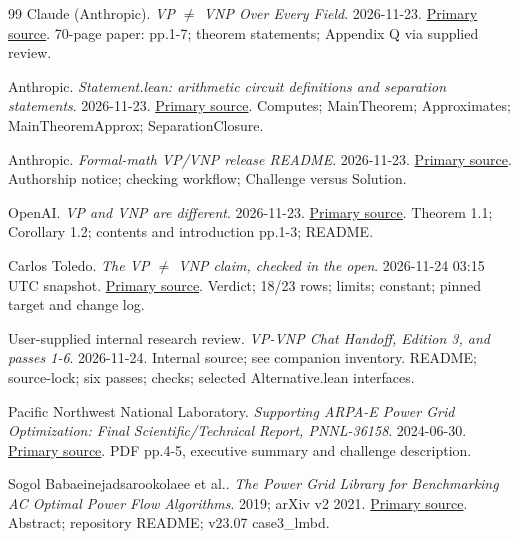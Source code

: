 \documentclass[11pt,letterpaper]{article}
\begin{document}
\endgroup
\clearpage
{}
\begin{thebibliography}{99}
 Claude (Anthropic). \emph{VP $\ne$ VNP Over Every Field}. 2026-11-23. \href{https://github.com/anthropics/formal-math/blob/11b6c7e3c927df2658f513b6b68ea7f8929c62c5/vp-vnp/paper.pdf}{Primary source}. 70-page paper: pp.1-7; theorem statements; Appendix Q via supplied review.

 Anthropic. \emph{Statement.lean: arithmetic circuit definitions and separation statements}. 2026-11-23. \href{https://github.com/anthropics/formal-math/blob/11b6c7e3c927df2658f513b6b68ea7f8929c62c5/vp-vnp/Statement.lean}{Primary source}. Computes; MainTheorem; Approximates; MainTheoremApprox; SeparationClosure.

 Anthropic. \emph{Formal-math VP/VNP release README}. 2026-11-23. \href{https://github.com/anthropics/formal-math/blob/main/vp-vnp/README.md}{Primary source}. Authorship notice; checking workflow; Challenge versus Solution.

 OpenAI. \emph{VP and VNP are different}. 2026-11-23. \href{https://github.com/openai/math/blob/main/preprints/VP-and-VNP-are-different-November-23-2026/paper.pdf}{Primary source}. Theorem 1.1; Corollary 1.2; contents and introduction pp.1-3; README.

 Carlos Toledo. \emph{The VP $\ne$ VNP claim, checked in the open}. 2026-11-24 03:15 UTC snapshot. \href{https://carlostoledo.co/vp-vnp/}{Primary source}. Verdict; 18/23 rows; limits; constant; pinned target and change log.

 User-supplied internal research review. \emph{VP-VNP Chat Handoff, Edition 3, and passes 1-6}. 2026-11-24. Internal source; see companion inventory. README; source-lock; six passes; checks; selected Alternative.lean interfaces.

 Pacific Northwest National Laboratory. \emph{Supporting ARPA-E Power Grid Optimization: Final Scientific/Technical Report, PNNL-36158}. 2024-06-30. \href{https://www.osti.gov/servlets/purl/2404530}{Primary source}. PDF pp.4-5, executive summary and challenge description.

 Sogol Babaeinejadsarookolaee et al.. \emph{The Power Grid Library for Benchmarking AC Optimal Power Flow Algorithms}. 2019; arXiv v2 2021. \href{https://arxiv.org/abs/1908.02788}{Primary source}. Abstract; repository README; v23.07 case3\_lmbd.


\end{thebibliography}
\end{document}

